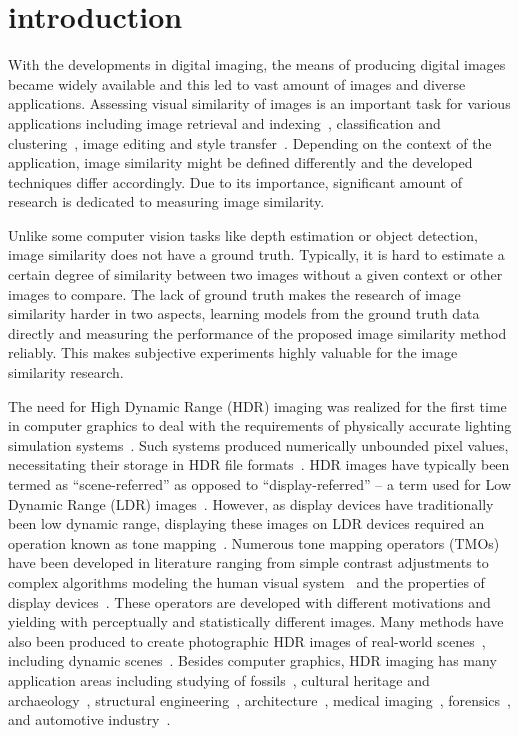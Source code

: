 \chapter{introduction}
\label{chp:b1}
With the developments in digital imaging, the means of producing digital images became widely available and this led to vast amount of images and diverse applications. Assessing visual similarity of images is an important task for various applications including image retrieval and indexing~\cite{liu2007survey}, classification and clustering~\cite{kleiman2016toward}, image editing and style transfer~\cite{rawat2018find}. Depending on the context of the application, image similarity might be defined differently and the developed techniques differ accordingly. Due to its importance, significant amount of research is dedicated to measuring image similarity. 

Unlike some computer vision tasks like depth estimation or object detection, image similarity does not have a ground truth. Typically, it is hard to estimate a certain degree of similarity between two images without a given context or other images to compare. The lack of ground truth makes the research of image similarity harder in two aspects, learning models from the ground truth data directly and measuring the performance of the proposed image similarity method reliably. This makes subjective experiments highly valuable for the image similarity research.

The need for High Dynamic Range (HDR) imaging was realized for the first time in computer graphics to deal with the requirements of physically accurate lighting simulation systems~\cite{glassner1995principles}. Such systems produced numerically unbounded pixel values, necessitating their storage in HDR file formats~\cite{ward1998rendering}. HDR images have typically been termed as ``scene-referred'' as opposed to ``display-referred'' -- a term used for Low Dynamic Range (LDR) images~\cite{Rein2010}. However, as display devices have traditionally been low dynamic range, displaying these images on LDR devices required an operation known as tone mapping~\cite{Tumb93,Ward97}. Numerous tone mapping operators (TMOs) have been developed in literature ranging from simple contrast adjustments to complex algorithms modeling the human visual system~\cite{Ferw96} and the properties of display devices~\cite{Mantiuk2008}. These operators are developed with different motivations and yielding with perceptually and statistically different images. Many methods have also been produced to create photographic HDR images of real-world scenes~\cite{Debe97}, including dynamic scenes~\cite{sen2012robust,kalantari2017deep}. Besides computer graphics, HDR imaging has many application areas including studying of fossils~\cite{theodor2009high}, cultural heritage and archaeology~\cite{happa2010high}, structural engineering~\cite{grinzato2009seismic}, architecture~\cite{cai2013high}, medical imaging~\cite{harifi2015efficient,rizzi2018visual}, forensics~\cite{brown2010forensic}, and automotive industry~\cite{wu2012fast}.

